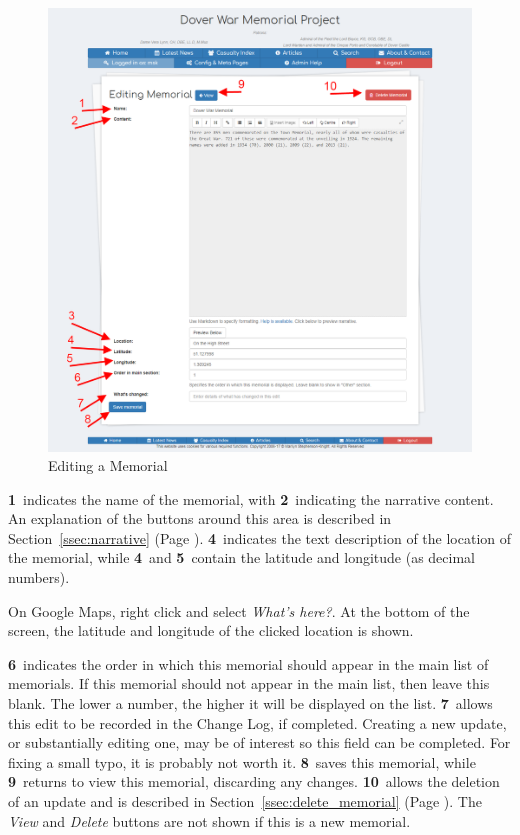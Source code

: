 \documentclass[12pt]{article}
\newcommand{\marker}[1]{\color{red}\textbf{#1}\color{black}}
\newcommand{\myref}[1]{\ref{#1} {\scriptsize(Page \pageref{#1})}}
\begin{document}
\begin{figure}[h]
  \centering
 \includegraphics[width=.9\textwidth]{pics/edit_memorial.png}
	\caption{Editing a Memorial}\label{fig:edit_memorial}
\end{figure}

\marker{1}\ indicates the name of the memorial, with \marker{2}\ indicating the narrative content. An explanation of the buttons around this area is described in Section~\myref{ssec:narrative}. \marker{4}\ indicates the text description of the location of the memorial, while \marker{4}\ and \marker{5}\ contain the latitude and longitude (as decimal numbers). 

\begin{infoBox}
On Google Maps, right click and select \textit{What's here?}. At the bottom of the screen, the latitude and longitude of the clicked location is shown.
\end{infoBox}

\marker{6}\ indicates the order in which this memorial should appear in the main list of memorials. If this memorial should not appear in the main list, then leave this blank. The lower a number, the higher it will be displayed on the list. \marker{7}\ allows this edit to be recorded in the Change Log, if completed. Creating a new update, or substantially editing one, may be of interest so this field can be completed. For fixing a small typo, it is probably not worth it. \marker{8}\ saves this memorial, while \marker{9}\ returns to view this memorial, discarding any changes. \marker{10}\ allows the deletion of an update and is described in Section~\myref{ssec:delete_memorial}. The \textit{View} and \textit{Delete} buttons are not shown if this is a new memorial.
\end{document}
